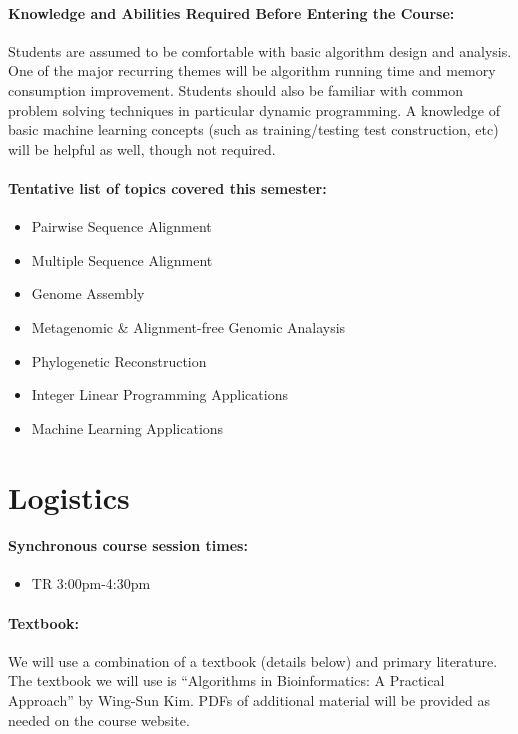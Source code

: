 \documentclass[12pt]{scrartcl}
\begin{document}
\paragraph{Knowledge and Abilities Required Before Entering the Course:} Students are assumed to be comfortable with basic algorithm design and analysis. 
One of the major recurring themes will be algorithm running time and memory consumption improvement. 
Students should also be familiar with common problem solving techniques in particular dynamic programming.
A knowledge of basic machine learning concepts (such as training/testing test construction, etc) will be helpful as well, though not required. 

\paragraph{Tentative list of topics covered this semester:}
\begin{itemize} 
\item Pairwise Sequence Alignment
\item Multiple Sequence Alignment
\item Genome Assembly
\item Metagenomic \& Alignment-free Genomic Analaysis
\item Phylogenetic Reconstruction
\item Integer Linear Programming Applications
\item Machine Learning Applications
\end{itemize}

\tableofcontents

\section{Logistics}
\paragraph{Synchronous course session times:}
\begin{itemize}
\item TR 3:00pm-4:30pm
\end{itemize}


\paragraph{Textbook:} We will use a combination of a textbook (details below) and primary literature. 
The textbook we will use is ``Algorithms in Bioinformatics: A Practical Approach'' by Wing-Sun Kim. 
PDFs of additional material will be provided as needed on the course website. 
\end{document}
